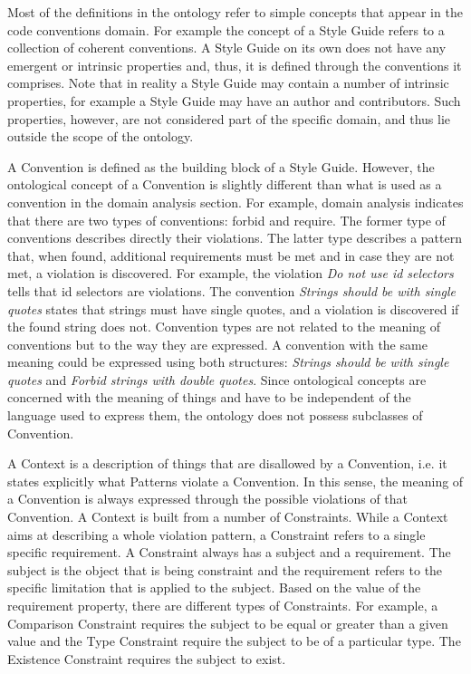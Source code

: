 \documentclass[parskip=full]{uvamscse}
\begin{document}
Most of the definitions in the ontology refer to simple concepts that appear in the code conventions
domain. For example the concept of a Style Guide refers to a collection of coherent conventions. A
Style Guide on its own does not have any emergent or intrinsic properties and, thus, it is defined
through the conventions it comprises. Note that in reality a Style Guide may contain a number of
intrinsic properties, for example a Style Guide may have an author and contributors. Such
properties, however, are not considered part of the specific domain, and thus lie outside the scope
of the ontology.

A Convention is defined as the building block of a Style Guide. However, the ontological concept of
a Convention is slightly different than what is used as a convention in the domain analysis section.
For example, domain analysis indicates that there are two types of conventions: forbid and require.
The former type of conventions describes directly their violations. The latter type describes a
pattern that, when found, additional requirements must be met and in case they are not met, a
violation is discovered. For example, the violation \textit{Do not use id selectors} tells that id
selectors are violations. The convention \textit{Strings should be with single quotes} states that
strings must have single quotes, and a violation is discovered if the found string does not.
Convention types are not related to the meaning of conventions but to the way they are expressed. A
convention with the same meaning could be expressed using both structures: \textit{Strings should be
with single quotes} and \textit{Forbid strings with double quotes}. Since ontological concepts are
concerned with the meaning of things and have to be independent of the language used to express
them, the ontology does not possess subclasses of Convention.

A Context is a description of things that are disallowed by a Convention, i.e. it states explicitly
what Patterns violate a Convention. In this sense, the meaning of a Convention is always expressed
through the possible violations of that Convention. A Context is built from a number of Constraints.
While a Context aims at describing a whole violation pattern, a Constraint refers to a single
specific requirement. A Constraint always has a subject and a requirement. The subject is the object
that is being constraint and the requirement refers to the specific limitation that is applied to
the subject. Based on the value of the requirement property, there are different types of
Constraints. For example, a Comparison Constraint requires the subject to be equal or greater than a
given value and the Type Constraint require the subject to be of a particular type. The Existence
Constraint requires the subject to exist.
\end{document}
